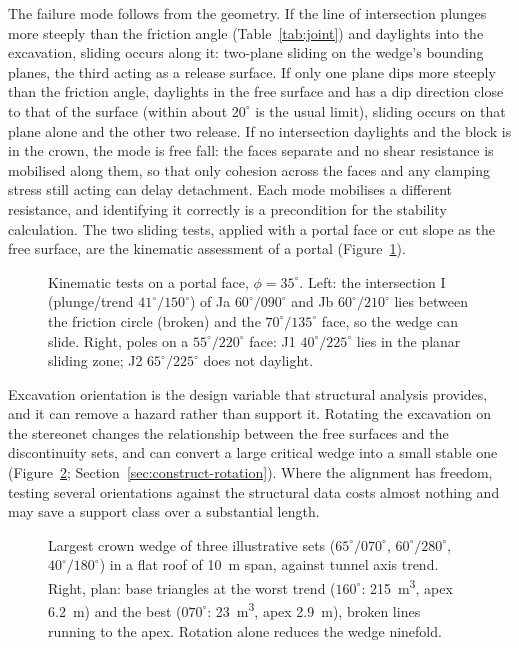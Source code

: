 The failure mode follows from the geometry. If the line of intersection
plunges more steeply than the friction angle (Table~\ref{tab:joint}) and daylights into the
excavation, sliding occurs along it: two-plane sliding on the wedge's
bounding planes, the third acting as a release surface. If only one plane
dips more steeply than the friction angle, daylights in the free surface and
has a dip direction close to that of the surface (within about $20^\circ$ is
the usual limit), sliding occurs on that plane alone and the other two
release. If no intersection daylights and the block is in the crown, the mode
is free fall: the faces separate and no shear resistance is mobilised along
them, so that only cohesion across the faces and any clamping stress still
acting can delay detachment. Each mode mobilises a different resistance, and identifying it
correctly is a precondition for the stability calculation. The two sliding
tests, applied with a portal face or cut slope as the free surface, are the
kinematic assessment of a portal (Figure~\ref{fig:portal-kinematics}).

\begin{figure}[htbp]
\centering
{}
\caption{Kinematic tests on a portal face, $\phi = 35^\circ$. Left: the intersection I (plunge/trend $41^\circ/150^\circ$) of Ja $60^\circ/090^\circ$ and Jb $60^\circ/210^\circ$ lies between the friction circle (broken) and the $70^\circ/135^\circ$ face, so the wedge can slide. Right, poles on a $55^\circ/220^\circ$ face: J1 $40^\circ/225^\circ$ lies in the planar sliding zone; J2 $65^\circ/225^\circ$ does not daylight.}
\label{fig:portal-kinematics}
\end{figure}

Excavation orientation is the design variable that structural analysis
provides, and it can remove a hazard rather than support it. Rotating the
excavation on the stereonet changes the relationship between the free surfaces
and the discontinuity sets, and can convert a large critical wedge into a
small stable one (Figure~\ref{fig:crown-wedge-orientation};
Section~\ref{sec:construct-rotation}). Where the alignment has freedom, testing several
orientations against the structural data costs almost nothing and may save a
support class over a substantial length.

\begin{figure}[htbp]
\centering
{}
\caption{Largest crown wedge of three illustrative sets ($65^\circ/070^\circ$, $60^\circ/280^\circ$, $40^\circ/180^\circ$) in a flat roof of 10~m span, against tunnel axis trend. Right, plan: base triangles at the worst trend ($160^\circ$: 215~m\textsuperscript{3}, apex 6.2~m) and the best ($070^\circ$: 23~m\textsuperscript{3}, apex 2.9~m), broken lines running to the apex. Rotation alone reduces the wedge ninefold.}
\label{fig:crown-wedge-orientation}
\end{figure}

